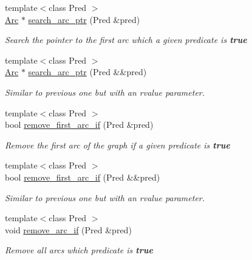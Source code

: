 \begin{DoxyCompactItemize}
{\footnotesize template$<$class Pred $>$ }\\\hyperlink{namespace_designar_a3f55fb5513d62ff47cbc8f72b8e95d6f}{Arc} $\ast$ \hyperlink{class_designar_1_1_base_graph_a27d1effa356e6570ddca3c71559e7eb7}{search\+\_\+arc\+\_\+ptr} (Pred \&pred)
\begin{DoxyCompactList}\small\item\em Search the pointer to the first arc which a given predicate is {\bfseries true} \end{DoxyCompactList}\item 
{\footnotesize template$<$class Pred $>$ }\\\hyperlink{namespace_designar_a3f55fb5513d62ff47cbc8f72b8e95d6f}{Arc} $\ast$ \hyperlink{class_designar_1_1_base_graph_a6d7036b2c4b78dcc46de3fc0d314b871}{search\+\_\+arc\+\_\+ptr} (Pred \&\&pred)
\begin{DoxyCompactList}\small\item\em Similar to previous one but with an rvalue parameter. \end{DoxyCompactList}\item 
{\footnotesize template$<$class Pred $>$ }\\bool \hyperlink{class_designar_1_1_base_graph_ae45255ef62c056e76c5e5c45182e9490}{remove\+\_\+first\+\_\+arc\+\_\+if} (Pred \&pred)
\begin{DoxyCompactList}\small\item\em Remove the first arc of the graph if a given predicate is {\bfseries true} \end{DoxyCompactList}\item 
{\footnotesize template$<$class Pred $>$ }\\bool \hyperlink{class_designar_1_1_base_graph_a990426c9e87f922bbbd0c9bc4d2cedd8}{remove\+\_\+first\+\_\+arc\+\_\+if} (Pred \&\&pred)
\begin{DoxyCompactList}\small\item\em Similar to previous one but with an rvalue parameter. \end{DoxyCompactList}\item 
{\footnotesize template$<$class Pred $>$ }\\void \hyperlink{class_designar_1_1_base_graph_a9c97f2759a2847e61e17dc2806172758}{remove\+\_\+arc\+\_\+if} (Pred \&pred)
\begin{DoxyCompactList}\small\item\em Remove all arcs which predicate is {\bfseries true} \end{DoxyCompactList}\item 

\end{DoxyCompactItemize}
